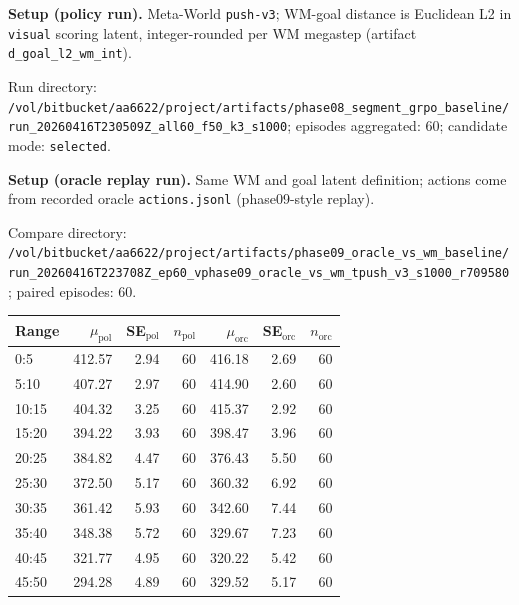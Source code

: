 
\par\smallskip
\nopagebreak[4]
\begin{minipage}{\linewidth}
\raggedright

\noindent\textbf{Setup (policy run).} Meta-World \texttt{push-v3}; WM-goal distance is Euclidean L2 in \texttt{visual} scoring latent, integer-rounded per WM megastep (artifact \texttt{d\_goal\_l2\_wm\_int}).

Run directory: \texttt{/vol/bitbucket/aa6622/project/artifacts/phase08\_segment\_grpo\_baseline/run\_20260416T230509Z\_all60\_f50\_k3\_s1000}; episodes aggregated: 60; candidate mode: \texttt{selected}.

\noindent\textbf{Setup (oracle replay run).} Same WM and goal latent definition; actions come from recorded oracle \texttt{actions.jsonl} (phase09-style replay).

Compare directory: \texttt{/vol/bitbucket/aa6622/project/artifacts/phase09\_oracle\_vs\_wm\_baseline/run\_20260416T223708Z\_ep60\_vphase09\_oracle\_vs\_wm\_tpush\_v3\_s1000\_r709580}; paired episodes: 60.

\begin{center}
\begin{tabular}{lrrrrrr}
\hline
Range & $\mu_{\mathrm{pol}}$ & SE$_{\mathrm{pol}}$ & $n_{\mathrm{pol}}$ & $\mu_{\mathrm{orc}}$ & SE$_{\mathrm{orc}}$ & $n_{\mathrm{orc}}$ \\
\hline
0:5 &  412.57 &  2.94 & 60 &  416.18 &  2.69 & 60 \\
5:10 &  407.27 &  2.97 & 60 &  414.90 &  2.60 & 60 \\
10:15 &  404.32 &  3.25 & 60 &  415.37 &  2.92 & 60 \\
15:20 &  394.22 &  3.93 & 60 &  398.47 &  3.96 & 60 \\
20:25 &  384.82 &  4.47 & 60 &  376.43 &  5.50 & 60 \\
25:30 &  372.50 &  5.17 & 60 &  360.32 &  6.92 & 60 \\
30:35 &  361.42 &  5.93 & 60 &  342.60 &  7.44 & 60 \\
35:40 &  348.38 &  5.72 & 60 &  329.67 &  7.23 & 60 \\
40:45 &  321.77 &  4.95 & 60 &  320.22 &  5.42 & 60 \\
45:50 &  294.28 &  4.89 & 60 &  329.52 &  5.17 & 60 \\
\hline
\end{tabular}
\end{center}


\end{minipage}
